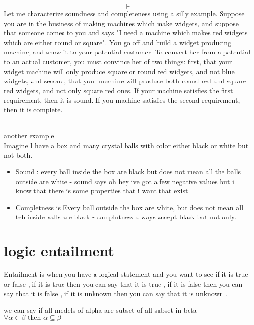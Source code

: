 \documentclass{article}
\theoremstyle{mytheoremstyle}
\theoremstyle{mytheoremstyle}
\theoremstyle{myproblemstyle}
\begin{document}
\[
    \vdash
\]
Let me characterize soundness and completeness using a silly example. Suppose you are in the business of making machines which make widgets, and suppose that someone comes to you and says "I need a machine which makes red widgets which are either round or square". You go off and build a widget producing machine, and show it to your potential customer. To convert her from a potential to an actual customer, you must convince her of two things: first, that your widget machine will only produce square or round red widgets, and not blue widgets, and second, that your machine will produce both round red and square red widgets, and not only square red ones. If your machine satisfies the first requirement, then it is sound. If you machine satisfies the second requirement, then it is complete.

\\
another example
\\
Imagine I have a box and many crystal balls with color either black or white but not both.
\begin{itemize}
    \item Sound : every ball inside the box are black but does not mean all the balls outside are white - sound says oh hey ive got a few negative values but i know that there is some properties that i want that exist
    \item Completness is Every ball outside the box are white, but does not mean all teh inside valls are black - complntness always accept black but not only.
\end{itemize}

\section{logic entailment}
Entailment is when you have a logical statement and you want to see if it is true or false , if it is true then you can say that it is true , if it is false then you can say that it is false , if it is unknown then you can say that it is unknown .

we can say if all models of alpha are subset of all subset in beta
\begin{math}
    \forall \alpha \in \beta \text{ then } \alpha \subseteq \beta
\end{math}
\end{document}
